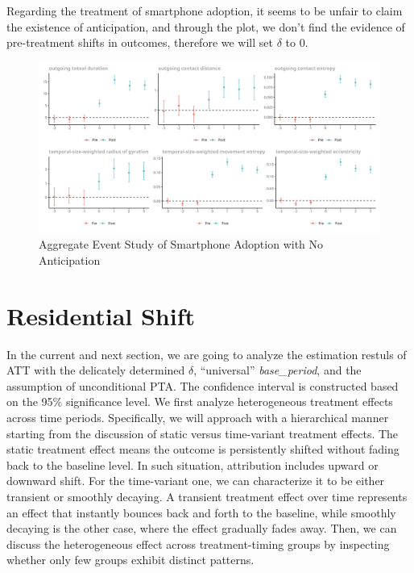 Regarding the treatment of smartphone adoption, it seems to be unfair to claim the existence of anticipation, and through the plot, we don't find the evidence of pre-treatment shifts in outcomes, therefore we will set $\delta$ to 0.

\begin{figure}[h!]
\centering
\caption{Aggregate Event Study of Smartphone Adoption with No Anticipation}
\vspace{0.1cm}

\includegraphics[width=1\textwidth]{figures/csdid/inspect_delta/smartphone_adoption.png}

\label{fig:select_delta_smartphone_adoption}
\end{figure}

\clearpage\newpage
\section{Residential Shift}\label{main_res_residential_shift}
In the current and next section, we are going to analyze the estimation restuls of ATT with the delicately determined \( \delta \), ``universal'' \textit{base\_period}, and the assumption of unconditional PTA. The confidence interval is constructed based on the 95\% significance level. We first analyze heterogeneous treatment effects across time periods. Specifically, we will approach with a hierarchical manner starting from the discussion of static versus time-variant treatment effects. The static treatment effect means the outcome is persistently shifted without fading back to the baseline level. In such situation, attribution includes upward or downward shift. For the time-variant one, we can characterize it to be either transient or smoothly decaying. A transient treatment effect over time represents an effect that instantly bounces back and forth to the baseline, while smoothly decaying is the other case, where the effect gradually fades away. Then, we can discuss the heterogeneous effect across treatment-timing groups by inspecting whether only few groups exhibit distinct patterns.


